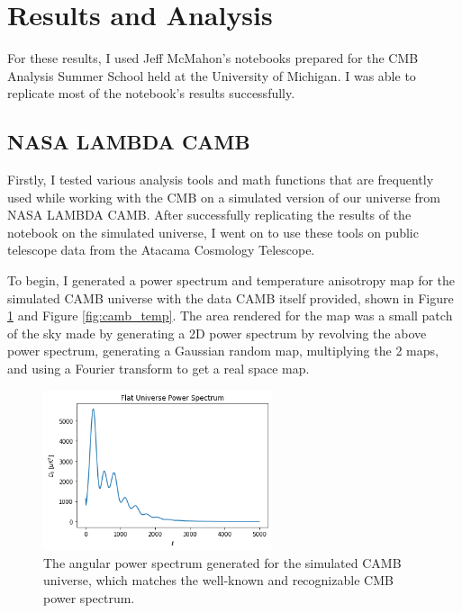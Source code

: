 \documentclass[12pt]{article}
\begin{document}
\section{Results and Analysis}
For these results, I used Jeff McMahon’s notebooks prepared for the CMB Analysis Summer School held at the University of Michigan. I was able to replicate most of the notebook’s results successfully.

\subsection{NASA LAMBDA CAMB}
Firstly, I tested various analysis tools and math functions that are frequently used while working with the CMB on a simulated version of our universe from NASA LAMBDA CAMB. After successfully replicating the results of the notebook on the simulated universe, I went on to use these tools on public telescope data from the Atacama Cosmology Telescope.

To begin, I generated a power spectrum and temperature anisotropy map for the simulated CAMB universe with the data CAMB itself provided, shown in Figure \ref{fig:fs} and Figure \ref{fig:camb_temp}. The area rendered for the map was a small patch of the sky made by generating a 2D power spectrum by revolving the above power spectrum, generating a Gaussian random map, multiplying the 2 maps, and using a Fourier transform to get a real space map.

\begin{figure}[H]
    \centering
    \includegraphics[width=0.6\textwidth]{images/fs.png}
    \caption{The angular power spectrum generated for the simulated CAMB universe, which matches the well-known and recognizable CMB power spectrum.}
    \label{fig:fs}
\end{figure}
\end{document}
